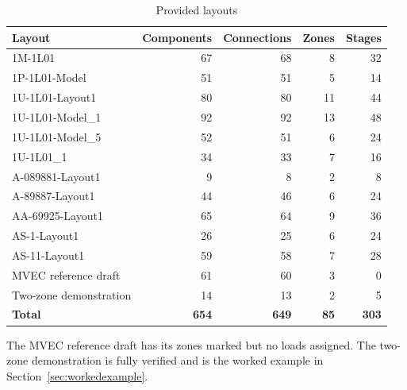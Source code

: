\begin{table}[H]
  \centering
  \caption{Provided layouts}
  \label{tab:layouts}
  \begin{tabular}{l r r r r}
    \toprule
    \textbf{Layout} & \textbf{Components} & \textbf{Connections} & \textbf{Zones} & \textbf{Stages} \\
    \midrule
    1M-1L01 & 67 & 68 & 8 & 32 \\
    1P-1L01-Model & 51 & 51 & 5 & 14 \\
    1U-1L01-Layout1 & 80 & 80 & 11 & 44 \\
    1U-1L01-Model\_1 & 92 & 92 & 13 & 48 \\
    1U-1L01-Model\_5 & 52 & 51 & 6 & 24 \\
    1U-1L01\_1 & 34 & 33 & 7 & 16 \\
    A-089881-Layout1 & 9 & 8 & 2 & 8 \\
    A-89887-Layout1 & 44 & 46 & 6 & 24 \\
    AA-69925-Layout1 & 65 & 64 & 9 & 36 \\
    AS-1-Layout1 & 26 & 25 & 6 & 24 \\
    AS-11-Layout1 & 59 & 58 & 7 & 28 \\
    MVEC reference draft & 61 & 60 & 3 & 0 \\
    Two-zone demonstration & 14 & 13 & 2 & 5 \\
    \midrule
    \textbf{Total} & \textbf{654} & \textbf{649} & \textbf{85} & \textbf{303} \\
    \bottomrule
  \end{tabular}
\end{table}

The MVEC reference draft has its zones marked but no loads assigned. The two-zone
demonstration is fully verified and is the worked example in
Section~\ref{sec:workedexample}.

